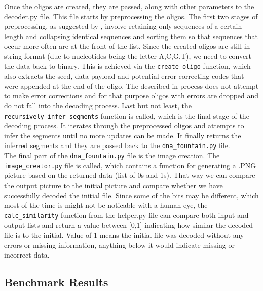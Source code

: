 \documentclass[12pt]%
{article}
\begin{document}
Once the oligos are created, they are passed, along with other parameters to the decoder.py file. This file starts by preprocessing the oligos. The first two stages of preprocessing, as suggested by \cite{erlich2017dnasupplementary}, involve retaining only sequences of a certain length and collapsing identical sequences and sorting them so that sequences that occur more often are at the front of the list. Since the created oligos are still in string format (due to nucleotides being the letter A,C,G,T), we need to convert the data back to binary. This is achieved via the \texttt{create\_oligo} function, which also extracts the seed, data payload and potential error correcting codes that were appended at the end of the oligo. The described in \cite{erlich2017dna} process does not attempt to make error corrections and for that purpose oligos with errors are dropped and do not fall into the decoding process. Last but not least, the \texttt{recursively\_infer\_segments} function is called, which is the final stage of the decoding process. It iterates through the preprocessed oligos and attempts to infer the segments until no more updates can be made. It finally returns the inferred segments and they are passed back to the \texttt{dna\_fountain.py} file. \\
The final part of the \texttt{dna\_fountain.py} file is the image creation. The \texttt{image\_creator.py} file is called, which contains a function for generating a .PNG picture based on the returned data (list of 0s and 1s). That way we can compare the output picture to the initial picture and compare whether we have successfully decoded the initial file. Since some of the bits may be different, which most of the time is might not be noticable with a human eye, the \texttt{calc\_similarity} function from the helper.py file can compare both input and output lists and return a value between [0,1] indicating how similar the decoded file is to the initial. Value of 1 means the initial file was decoded without any errors or missing information, anything below it would indicate missing or incorrect data.


\subsection{Benchmark Results}\label{subsec:benchmark_results}
\end{document}
